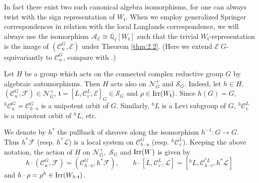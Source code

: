 \documentclass[11pt]{amsart}
\theoremstyle{definition}
\newcommand{\mc}{\mathcal}
\newcommand{\Q}{\mathbb Q}
\def\Irr{{\rm Irr}}
\def\cC{{\mathcal C}}
\def\cE{{\mathcal E}}
\def\ft{{\mathfrak t}}
\begin{document}
In fact there exist two such canonical algebra isomorphisms, for one can always twist 
with the sign representation of $W_\ft$. When we employ generalized Springer 
correspondences in relation with the local Langlands correspondence, we will always 
use the isomorphism $\mc A_\cE \cong \overline{\Q_{\ell}}[W_\ft]$ such that the trivial 
$W_\ft$-representation is the image of $(\cC_u^G, \cE)$ under Theorem \ref{thm:2.2}.
(Here we extend $\cE \; G$-equivariantly to $\cC_u^G$, compare with \cite[9.5]{Lus1}.)

Let $H$ be a group which acts on the connected complex reductive group $G$ by
algebraic automorphisms.
Then $H$ acts also on $\mathcal{N}_{G}^{+}$ and $\mathcal{S}_{G}$. Indeed, let $h \in H$,  
$(\mathcal{C}^{G}_{u},\mathcal{F}) \in \mathcal{N}_{G}^{+}$, $\mathfrak{t}=
[L,\mathcal{C}_{v}^{L},\cE]_{G} \in \mathcal{S}_{G}$ and $\rho \in \Irr(W_{\mathfrak{t}})$. 
Since $h (G) = G$, ${}^h \mathcal{C}_{u}^{G} = \mathcal{C}_{h \cdot u}^{G}$ 
is a unipotent orbit of $G$. Similarly, ${}^h L$ is a Levi subgroup of 
$G$, ${}^h \mathcal{C}_{v}^{L}$ is a unipotent orbit of ${}^h L$, etc. 

We denote by $h^*$ the pullback of sheaves along the isomorphism $h^{-1} : G \to G$. 
Thus $h^{*} \mathcal{F}$ (resp. $h^{*}\mathcal{L}$) is a local system on 
$\mathcal{C}^{G}_{h \cdot u}$ (resp. ${}^{h} \mathcal{C}_{v}^{L}$). Keeping the 
above notation, the action of $H$ on $\mathcal{N}_{G}^{+}, \,\, 
\mathcal{S}_{G}$ and $\Irr(W)$ is given by
\[
h \cdot (\mathcal{C}^{G}_{u},\mathcal{F})=(\mathcal{C}^{G}_{h \cdot u},h^{*} 
\mathcal{F}), \qquad h \cdot [L,\mathcal{C}_{v}^{L},\mathcal{L}]=[{}^{h} L,
\mathcal{C}^{{}^{h} L}_{h \cdot v}, h^{*} \mathcal{L}] 
\]
and $h \cdot \rho = \rho^{h} \in \Irr(W_{h \cdot \mathfrak{t}})$.
\end{document}
